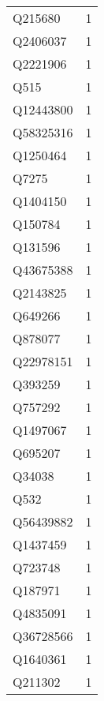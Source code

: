 \begin{tabular}{lr}
     Q215680 &                             1 \\
    Q2406037 &                             1 \\
    Q2221906 &                             1 \\
        Q515 &                             1 \\
   Q12443800 &                             1 \\
   Q58325316 &                             1 \\
    Q1250464 &                             1 \\
       Q7275 &                             1 \\
    Q1404150 &                             1 \\
     Q150784 &                             1 \\
     Q131596 &                             1 \\
   Q43675388 &                             1 \\
    Q2143825 &                             1 \\
     Q649266 &                             1 \\
     Q878077 &                             1 \\
   Q22978151 &                             1 \\
     Q393259 &                             1 \\
     Q757292 &                             1 \\
    Q1497067 &                             1 \\
     Q695207 &                             1 \\
      Q34038 &                             1 \\
        Q532 &                             1 \\
   Q56439882 &                             1 \\
    Q1437459 &                             1 \\
     Q723748 &                             1 \\
     Q187971 &                             1 \\
    Q4835091 &                             1 \\
   Q36728566 &                             1 \\
    Q1640361 &                             1 \\
     Q211302 &                             1 \\

\end{tabular}
